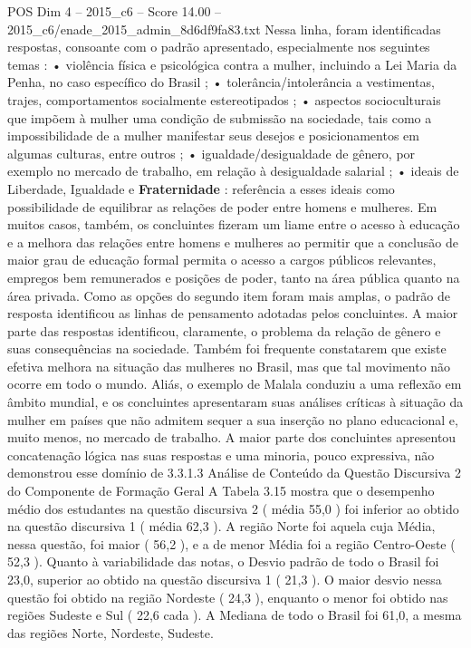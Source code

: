 \begin{textsample}{POS Dim 4 – 2015\_c6 – Score 14.00 – 2015\_c6/enade\_2015\_admin\_8d6df9fa83.txt}
Nessa linha, foram identificadas respostas, consoante com o padrão apresentado, especialmente nos seguintes temas : • violência física e psicológica contra a mulher, incluindo a Lei Maria da Penha, no caso específico do Brasil ; • tolerância/intolerância a vestimentas, trajes, comportamentos socialmente estereotipados ; • aspectos socioculturais que impõem à mulher uma condição de submissão na sociedade, tais como a impossibilidade de a mulher manifestar seus desejos e posicionamentos em algumas culturas, entre outros ; • igualdade/desigualdade de gênero, por exemplo no mercado de trabalho, em relação à desigualdade salarial ; • ideais de Liberdade, Igualdade e \textbf{Fraternidade} : referência a esses ideais como possibilidade de equilibrar as relações de poder entre homens e mulheres.
Em muitos casos, também, os concluintes fizeram um liame entre o acesso à educação e a melhora das relações entre homens e mulheres ao permitir que a conclusão de maior grau de educação formal permita o acesso a cargos públicos relevantes, empregos bem remunerados e posições de poder, tanto na área pública quanto na área privada.
Como as opções do segundo item foram mais amplas, o padrão de resposta identificou as linhas de pensamento adotadas pelos concluintes.
A maior parte das respostas identificou, claramente, o problema da relação de gênero e suas consequências na sociedade.
Também foi frequente constatarem que existe efetiva melhora na situação das mulheres no Brasil, mas que tal movimento não ocorre em todo o mundo.
Aliás, o exemplo de Malala conduziu a uma reflexão em âmbito mundial, e os concluintes apresentaram suas análises críticas à situação da mulher em países que não admitem sequer a sua inserção no plano educacional e, muito menos, no mercado de trabalho.
A maior parte dos concluintes apresentou concatenação lógica nas suas respostas e uma minoria, pouco expressiva, não demonstrou esse domínio de 3.3.1.3 Análise de Conteúdo da Questão Discursiva 2 do Componente de Formação Geral A Tabela 3.15 mostra que o desempenho médio dos estudantes na questão discursiva 2 ( média 55,0 ) foi inferior ao obtido na questão discursiva 1 ( média 62,3 ).
A região Norte foi aquela cuja Média, nessa questão, foi maior ( 56,2 ), e a de menor Média foi a região Centro-Oeste ( 52,3 ).
Quanto à variabilidade das notas, o Desvio padrão de todo o Brasil foi 23,0, superior ao obtido na questão discursiva 1 ( 21,3 ).
O maior desvio nessa questão foi obtido na região Nordeste ( 24,3 ), enquanto o menor foi obtido nas regiões Sudeste e Sul ( 22,6 cada ).
A Mediana de todo o Brasil foi 61,0, a mesma das regiões Norte, Nordeste, Sudeste.

\end{textsample}
